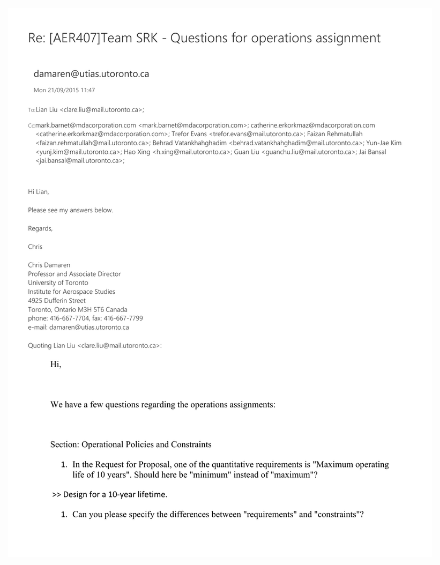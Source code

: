 \documentclass[12pt, letter]{article}
\begin{document}
\begin{figure}[H]
\includegraphics[height=\textheight, page=2]{email}
\end{figure}

\newpage
\end{document}
